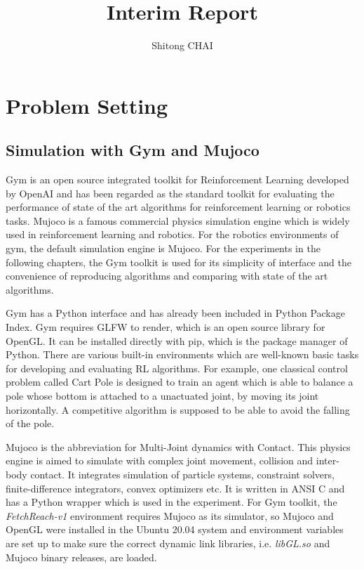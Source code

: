 \documentclass[a4paper, 12pt]{report}
\title{Interim Report}
\date{}
\author{Shitong CHAI}
\begin{document}
\maketitle
\tableofcontents

\chapter {Problem Setting}

    \section {Simulation with Gym and Mujoco}
    Gym\cite{1606.01540} is an open source integrated toolkit for Reinforcement Learning developed by OpenAI and has been regarded as the standard toolkit for evaluating the performance of state of the art algorithms for reinforcement learning or robotics tasks. Mujoco\cite{Todorov_mujoco:a} is a famous commercial physics simulation engine which is widely used in reinforcement learning and robotics. For the robotics environments of gym, the default simulation engine is Mujoco. For the experiments in the following chapters, the Gym toolkit is used for its simplicity of interface and the convenience of reproducing algorithms and comparing with state of the art algorithms.

    Gym has a Python interface and has already been included in Python Package Index. Gym requires GLFW to render, which is an open source library for OpenGL. It can be installed directly with pip, which is the package manager of Python. There are various built-in environments which are well-known basic tasks for developing and evaluating RL algorithms. For example, one classical control problem called Cart Pole is designed to train an agent which is able to balance a pole whose bottom is attached to a unactuated joint, by moving its joint horizontally. A competitive algorithm is supposed to be able to avoid the falling of the pole.

    Mujoco is the abbreviation for Multi-Joint dynamics with Contact. This physics engine is aimed to simulate with complex joint movement, collision and inter-body contact. It integrates simulation of particle systems, constraint solvers, finite-difference integrators, convex optimizers etc. It is written in ANSI C and has a Python wrapper which is used in the experiment. For Gym toolkit, the \emph{FetchReach-v1} environment requires Mujoco as its simulator, so Mujoco and OpenGL were installed in the Ubuntu 20.04 system and environment variables are set up to make sure the correct dynamic link libraries, i.e. \emph{libGL.so} and Mujoco binary releases, are loaded.
\end{document}
